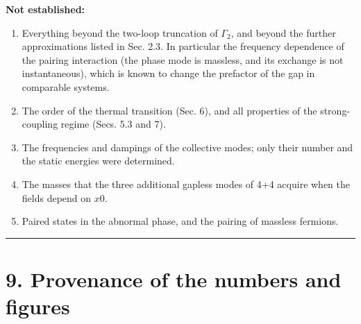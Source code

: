 \documentclass[
  10pt,
]{article}
\providecommand{\tightlist}{%
  \setlength{\itemsep}{0pt}\setlength{\parskip}{0pt}}
\begin{document}
\textbf{Not established:}

\begin{enumerate}
\def\labelenumi{\arabic{enumi}.}
\tightlist
\item
  Everything beyond the two-loop truncation of \(\Gamma_2\), and beyond
  the further approximations listed in Sec. 2.3. In particular the
  frequency dependence of the pairing interaction (the phase mode is
  massless, and its exchange is not instantaneous), which is known to
  change the prefactor of the gap in comparable systems.
\item
  The order of the thermal transition (Sec. 6), and all properties of
  the strong-coupling regime (Secs. 5.3 and 7).
\item
  The frequencies and dampings of the collective modes; only their
  number and the static energies were determined.
\item
  The masses that the three additional gapless modes of 4+4 acquire when
  the fields depend on \(x0\).
\item
  Paired states in the abnormal phase, and the pairing of massless
  fermions.
\end{enumerate}

\begin{center}\rule{0.5\linewidth}{0.5pt}\end{center}

\hypertarget{provenance-of-the-numbers-and-figures}{%
\section{9. Provenance of the numbers and
figures}\label{provenance-of-the-numbers-and-figures}}
\end{document}

